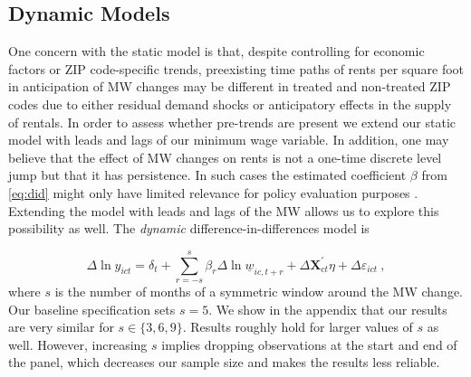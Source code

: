\subsection{Dynamic Models}

One concern with the static model is that, despite controlling for economic factors or ZIP 
code-specific trends, preexisting time paths of rents per square foot in anticipation of MW 
changes may be different in treated and non-treated ZIP codes due to either residual demand 
shocks or anticipatory effects in the supply of rentals. In order to assess whether pre-trends 
are present we extend our static model with leads and lags of our minimum wage variable. 
In addition, one may believe that the effect of MW changes on rents is not a one-time discrete 
level jump but that it has persistence. In such cases the estimated coefficient $\beta$ from 
\autoref{eq:did} might only have limited relevance for policy evaluation purposes 
\parencite{callaway2019}. Extending the model with leads and lags of the MW allows us to 
explore this possibility as well. The \textit{dynamic} difference-in-differences model is

\begin{equation} \label{eq:leads_lags}
	\Delta \ln y_{ict} = \delta_t
						+ \sum_{r=-s}^{s} \beta_r \Delta \ln \underline{w}_{ic,t+r}
						+ \Delta \mathbf{X}^{'}_{ct}\eta
						+ \Delta \varepsilon_{ict} \ ,
\end{equation}
where $s$ is the number of months of a symmetric window around the MW change. Our baseline
specification sets $s = 5$. We show in the appendix that our results are very similar for
$s \in \{3, 6, 9\}$. Results roughly hold for larger values of $s$ as well. However, increasing 
$s$ implies dropping observations at the start and end of the panel, which decreases our 
sample size and makes the results less reliable.

